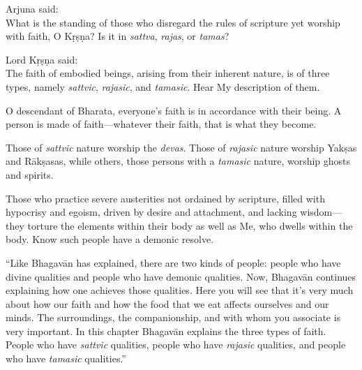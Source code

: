 {\hspace*{1em}Arjuna said: \\
What is the standing of those who disregard the rules of scripture yet worship with faith, O Kṛṣṇa? Is it in \textit{sattva}, \textit{rajas}, or \textit{tamas}?}

{Lord Kṛṣṇa said: \\
The faith of embodied beings, arising from their inherent nature, is of three types, namely \textit{sattvic}, \textit{rajasic}, and \textit{tamasic}. Hear My description of them.}

{O descendant of Bharata, everyone's faith is in accordance with their being. A person is made of faith---whatever their faith, that is what they become.}

{Those of \textit{sattvic} nature worship the \textit{devas}. Those of \textit{rajasic} nature worship Yakṣas and Rākṣasas, while others, those persons with a \textit{tamasic} nature, worship ghosts and spirits.}

{Those who practice severe austerities not ordained by scripture, filled with hypocrisy and egoism, driven by desire and attachment, and lacking wisdom---they torture the elements within their body as well as Me, who dwells within the body. Know such people have a demonic resolve.}

\enquote{Like Bhagavān has explained, there are two kinds of people: people who have divine qualities and people who have demonic qualities. Now, Bhagavān continues explaining how one achieves those qualities. Here you will see that it’s very much about how our faith and how the food that we eat affects ourselves and our minds. The surroundings, the companionship, and with whom you associate is very important. In this chapter Bhagavān explains the three types of faith. People who have \textit{sattvic} qualities, people who have \textit{rajasic} qualities, and people who have \textit{tamasic} qualities.}

